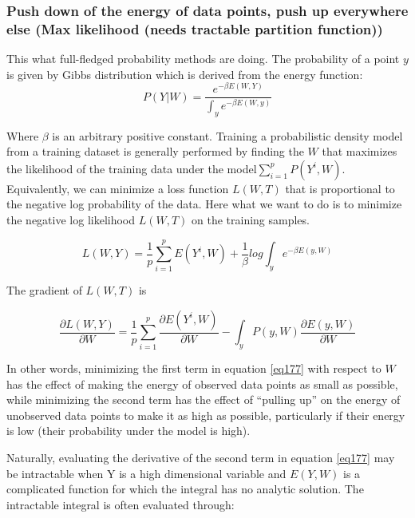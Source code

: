 \subsubsection{Push down of the energy of data points, push up everywhere else (Max likelihood (needs tractable partition function))}
    
This what full-fledged probability methods are doing. The probability of a point $y$ is given by Gibbs distribution which is derived from the energy function:
\begin{equation}
    P(Y|W) = \frac{e^{-\beta E(W,Y)}}{\int_y e^{-\beta E(W,y)}}
\end{equation}

Where $\beta$ is an arbitrary positive constant.
Training a probabilistic density model from a training dataset is generally performed by finding the $W$ that maximizes the likelihood of the training data under the model$ \sum^p_{i=1}P(Y^i,W)$. 
Equivalently, we can minimize a loss function $L(W,T)$ that is proportional to the negative log probability of the data. 
Here what we want to do is to minimize the negative log likelihood $L(W,T)$  on the training samples.

\begin{equation}\label{eq177}
    L(W,Y) = \frac{1}{p}\sum^p_{i=1}E(Y^i,W)+\frac{1}{\beta}log\int_y e^{-\beta E(y,W)}
\end{equation}

The gradient of $L(W,T)$ is

\begin{equation}
    \frac{\partial L(W,Y)}{\partial W}= \frac{1}{p}\sum^p_{i=1}\frac{\partial E(Y^i,W)}{\partial W}-\int_y P(y,W)\frac{\partial E(y,W)}{\partial W}
\end{equation}

In other words, minimizing the first term in equation \ref{eq177} with respect to $W$ has  the effect of making the energy of observed data points as small as possible, while minimizing the second term has the effect of “pulling up” on the energy of unobserved data points to make it as high as possible, particularly if their energy is low (their probability
under the model is high).

Naturally, evaluating the derivative of the second term in equation \ref{eq177}  may be intractable when Y is a high dimensional variable and $E(Y, W)$ is a complicated function for which the integral has no analytic solution. 
The intractable integral is often evaluated through:

